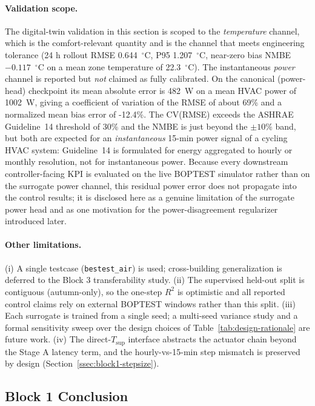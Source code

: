 \documentclass[11pt,a4paper]{article}
\newcommand{\Tsupply}{\ensuremath{T_{\mathrm{sup}}}}
\begin{document}
\paragraph{Validation scope.}
The digital-twin validation in this section is scoped to the \emph{temperature} channel, which is the comfort-relevant quantity and is the channel that meets engineering tolerance (24 h rollout RMSE 0.644~$^\circ$C, P95 1.207~$^\circ$C, near-zero bias NMBE \(-0.117\)~$^\circ$C on a mean zone temperature of 22.3~$^\circ$C). The instantaneous \emph{power} channel is reported but \emph{not} claimed as fully calibrated. On the canonical (power-head) checkpoint its mean absolute error is 482~W on a mean HVAC power of 1002~W, giving a coefficient of variation of the RMSE of about 69\% and a normalized mean bias error of -12.4\%. The CV(RMSE) exceeds the ASHRAE Guideline~14 threshold of 30\% and the NMBE is just beyond the \(\pm 10\%\) band, but both are expected for an \emph{instantaneous} 15-min power signal of a cycling HVAC system: Guideline~14 is formulated for energy aggregated to hourly or monthly resolution, not for instantaneous power. Because every downstream controller-facing KPI is evaluated on the live BOPTEST simulator rather than on the surrogate power channel, this residual power error does not propagate into the control results; it is disclosed here as a genuine limitation of the surrogate power head and as one motivation for the power-disagreement regularizer introduced later.

\paragraph{Other limitations.}
(i) A single testcase (\texttt{bestest\_air}) is used; cross-building generalization is deferred to the Block 3 transferability study. (ii) The supervised held-out split is contiguous (autumn-only), so the one-step \(R^2\) is optimistic and all reported control claims rely on external BOPTEST windows rather than this split. (iii) Each surrogate is trained from a single seed; a multi-seed variance study and a formal sensitivity sweep over the design choices of Table~\ref{tab:design-rationale} are future work. (iv) The direct-\Tsupply{} interface abstracts the actuator chain beyond the Stage A latency term, and the hourly-vs-15-min step mismatch is preserved by design (Section~\ref{ssec:block1-stepsize}).

\subsection{Block 1 Conclusion}
\label{ssec:block1-conclusion}
\end{document}

